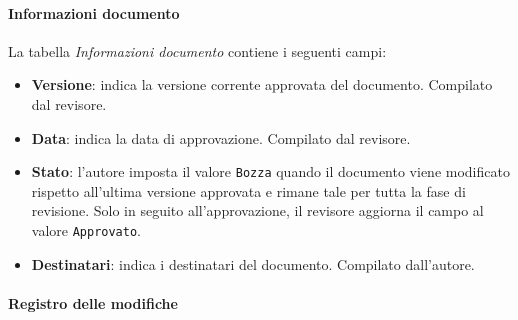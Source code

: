 \documentclass[11pt, a4paper]{article}
\begin{document}
\paragraph{Informazioni documento}

La tabella \textit{Informazioni documento} contiene i seguenti campi:
\begin{itemize}
    \item \textbf{Versione}: indica la versione corrente approvata del documento. Compilato dal revisore.
    \item \textbf{Data}: indica la data di approvazione. Compilato dal revisore.
    \item \textbf{Stato}: l'autore imposta il valore \texttt{Bozza} quando il documento viene modificato rispetto all'ultima versione approvata e rimane tale per tutta la fase di revisione. Solo in seguito all'approvazione, il revisore aggiorna il campo al valore \texttt{Approvato}.
    \item \textbf{Destinatari}: indica i destinatari del documento. Compilato dall'autore.
\end{itemize}

\paragraph{Registro delle modifiche}
\end{document}
